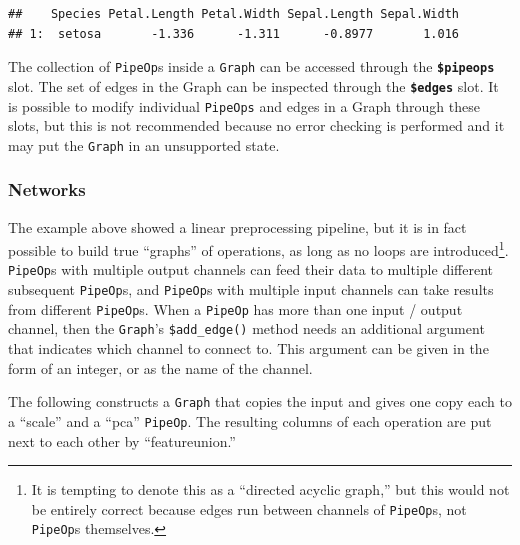\documentclass[
]{scrbook}
\newenvironment{Shaded}{\begin{snugshade}}{\end{snugshade}}
\newcommand{\DecValTok}[1]{\textcolor[rgb]{0.00,0.00,0.81}{#1}}
\newcommand{\FunctionTok}[1]{\textcolor[rgb]{0.00,0.00,0.00}{#1}}
\newcommand{\NormalTok}[1]{#1}
\newcommand{\SpecialCharTok}[1]{\textcolor[rgb]{0.00,0.00,0.00}{#1}}
\renewenvironment{Shaded} {\begin{snugshade}\small} {\end{snugshade}}
\begin{document}
\begin{Shaded}
\end{Shaded}

\begin{verbatim}
##    Species Petal.Length Petal.Width Sepal.Length Sepal.Width
## 1:  setosa       -1.336      -1.311      -0.8977       1.016
\end{verbatim}

The collection of \texttt{PipeOp}s inside a \texttt{Graph} can be accessed through the \textbf{\texttt{\$pipeops}} slot.
The set of edges in the Graph can be inspected through the \textbf{\texttt{\$edges}} slot.
It is possible to modify individual \texttt{PipeOps} and edges in a Graph through these slots, but this is not recommended because no error checking is performed and it may put the \texttt{Graph} in an unsupported state.

\hypertarget{networks}{%
\subsubsection{Networks}\label{networks}}

The example above showed a linear preprocessing pipeline, but it is in fact possible to build true ``graphs'' of operations, as long as no loops are introduced\footnote{It is tempting to denote this as a ``directed acyclic graph,'' but this would not be entirely correct because edges run between channels of \texttt{PipeOp}s, not \texttt{PipeOp}s themselves.}.
\texttt{PipeOp}s with multiple output channels can feed their data to multiple different subsequent \texttt{PipeOp}s, and \texttt{PipeOp}s with multiple input channels can take results from different \texttt{PipeOp}s.
When a \texttt{PipeOp} has more than one input / output channel, then the \texttt{Graph}'s \texttt{\$add\_edge()} method needs an additional argument that indicates which channel to connect to.
This argument can be given in the form of an integer, or as the name of the channel.

The following constructs a \texttt{Graph} that copies the input and gives one copy each to a ``scale'' and a ``pca'' \texttt{PipeOp}.
The resulting columns of each operation are put next to each other by ``featureunion.''
\end{document}
